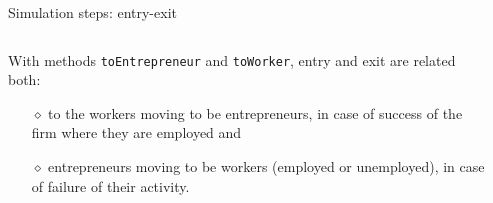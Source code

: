 \documentclass[9pt]{beamer}
\begin{document}
\begin{frame}[fragile]{Simulation steps: entry-exit}

\begin{columns}[T]
\begin{column}{.7\textwidth}
\begin{block}{}

With methods \verb|toEntrepreneur| and \verb|toWorker|, entry and exit are related both: 
\begin{itemize}
\item[$\diamond$] to the workers moving to be entrepreneurs, in case of success of the firm where they are employed and 

\item[$\diamond$]  entrepreneurs moving to be workers (employed or unemployed), in case of failure of their activity.
\end{itemize}     
\end{block}
\end{column}

 \begin{column}{.3\textwidth}
 \vspace{-7.1\baselineskip}
 \begin{block}{}
  \end{block}
  \end{column}
    
\end{columns}

\end{frame}
\end{document}
